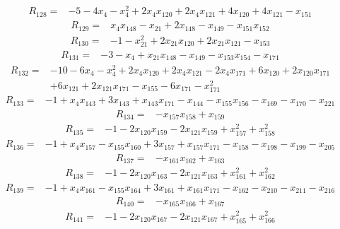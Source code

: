 \[\begin{aligned}R_{128}={}&-5-4x_{4}-x_{4}^{2}+2x_{4}x_{120}+2x_{4}x_{121}+4x_{120}+4x_{121}-x_{151}
\end{aligned}\]
\[\begin{aligned}R_{129}={}&x_{4}x_{148}-x_{21}+2x_{148}-x_{149}-x_{151}x_{152}
\end{aligned}\]
\[\begin{aligned}R_{130}={}&-1-x_{21}^{2}+2x_{21}x_{120}+2x_{21}x_{121}-x_{153}
\end{aligned}\]
\[\begin{aligned}R_{131}={}&-3-x_{4}+x_{21}x_{148}-x_{149}-x_{153}x_{154}-x_{171}
\end{aligned}\]
\[\begin{aligned}R_{132}={}&-10-6x_{4}-x_{4}^{2}+2x_{4}x_{120}+2x_{4}x_{121}-2x_{4}x_{171}+6x_{120}+2x_{120}x_{171}
\\&+6x_{121}+2x_{121}x_{171}-x_{155}-6x_{171}-x_{171}^{2}
\end{aligned}\]
\[\begin{aligned}R_{133}={}&-1+x_{4}x_{143}+3x_{143}+x_{143}x_{171}-x_{144}-x_{155}x_{156}-x_{169}-x_{170}-x_{221}
\end{aligned}\]
\[\begin{aligned}R_{134}={}&-x_{157}x_{158}+x_{159}
\end{aligned}\]
\[\begin{aligned}R_{135}={}&-1-2x_{120}x_{159}-2x_{121}x_{159}+x_{157}^{2}+x_{158}^{2}
\end{aligned}\]
\[\begin{aligned}R_{136}={}&-1+x_{4}x_{157}-x_{155}x_{160}+3x_{157}+x_{157}x_{171}-x_{158}-x_{198}-x_{199}-x_{205}
\end{aligned}\]
\[\begin{aligned}R_{137}={}&-x_{161}x_{162}+x_{163}
\end{aligned}\]
\[\begin{aligned}R_{138}={}&-1-2x_{120}x_{163}-2x_{121}x_{163}+x_{161}^{2}+x_{162}^{2}
\end{aligned}\]
\[\begin{aligned}R_{139}={}&-1+x_{4}x_{161}-x_{155}x_{164}+3x_{161}+x_{161}x_{171}-x_{162}-x_{210}-x_{211}-x_{216}
\end{aligned}\]
\[\begin{aligned}R_{140}={}&-x_{165}x_{166}+x_{167}
\end{aligned}\]
\[\begin{aligned}R_{141}={}&-1-2x_{120}x_{167}-2x_{121}x_{167}+x_{165}^{2}+x_{166}^{2}
\end{aligned}\]
